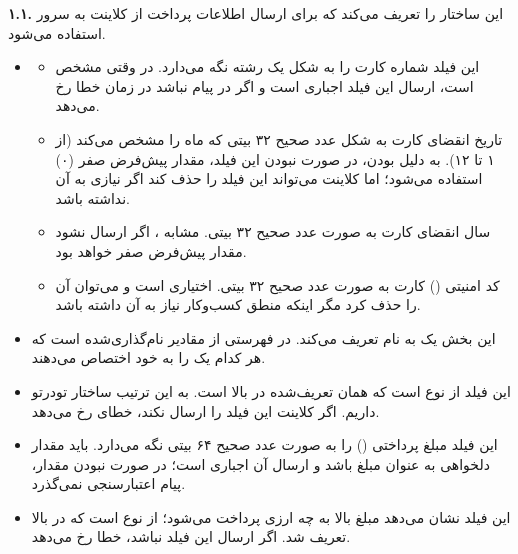 \noindent
\textbf{۱.۱. }  
این  ساختار  را تعریف می‌کند که برای ارسال اطلاعات پرداخت از کلاینت به سرور استفاده می‌شود.  
\begin{itemize}
    \item {}  
    \begin{itemize}
        \item {}  
        این فیلد شماره کارت را به شکل یک رشته  نگه می‌دارد. در  وقتی  مشخص است، ارسال این فیلد اجباری است و اگر در پیام نباشد در زمان  خطا رخ می‌دهد.  
        \item {}  
        تاریخ انقضای کارت به شکل عدد صحیح ۳۲ بیتی که ماه را مشخص می‌کند (از ۱ تا ۱۲). به دلیل  بودن، در صورت نبودن این فیلد، مقدار پیش‌فرض صفر (۰) استفاده می‌شود؛ اما کلاینت می‌تواند این فیلد را حذف کند اگر نیازی به آن نداشته باشد.  
        \item {}  
        سال انقضای کارت به صورت عدد صحیح ۳۲ بیتی. مشابه ، اگر ارسال نشود مقدار پیش‌فرض صفر خواهد بود.  
        \item {}  
        کد امنیتی () کارت به صورت عدد صحیح ۳۲ بیتی. اختیاری است و می‌توان آن را حذف کرد مگر اینکه منطق کسب‌وکار نیاز به آن داشته باشد.  
    \end{itemize}
    \item {}  
    این بخش یک  به نام  تعریف می‌کند.  در  فهرستی از مقادیر نام‌گذاری‌شده است که هر کدام یک  را به خود اختصاص می‌دهند.  
    \item {}  
    این فیلد از نوع  است که همان  تعریف‌شده در بالا است. به این ترتیب ساختار تودرتو داریم. اگر کلاینت این فیلد را ارسال نکند، خطای  رخ می‌دهد.  
    \item {}  
    این فیلد مبلغ پرداختی () را به صورت عدد صحیح ۶۴ بیتی نگه می‌دارد.  باید مقدار دلخواهی به عنوان مبلغ باشد و ارسال آن اجباری است؛ در صورت نبودن مقدار، پیام اعتبارسنجی نمی‌گذرد.  
    \item {}  
    این فیلد نشان می‌دهد مبلغ بالا به چه ارزی پرداخت می‌شود؛ از نوع  است که در بالا تعریف شد. اگر ارسال این فیلد نباشد، خطا رخ می‌دهد.  
\end{itemize}

